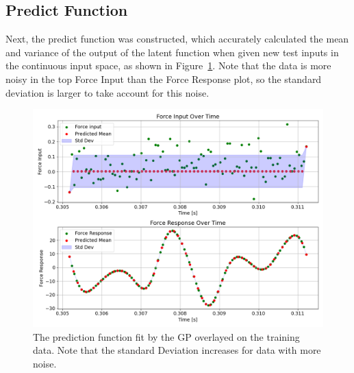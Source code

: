 \documentclass[12pt]{article}
\begin{document}
    \subsection{Predict Function}
    Next, the predict function was constructed, which accurately calculated the mean and variance of the output of the latent function when given new test inputs in the continuous input space, as shown in Figure~\ref{fig:input-response-predict}.
    Note that the data is more noisy in the top Force Input than the Force Response plot, so the standard deviation is larger to take account for this noise.

    \begin{figure}[ht]
        \centering
        \includegraphics[width=1.0\linewidth]{figures/input-response-predict/input-response-predict.png}
        \caption{The prediction function fit by the GP overlayed on the training data. Note that the standard Deviation increases for data with more noise.}
        \label{fig:input-response-predict}
    \end{figure}
\end{document}
